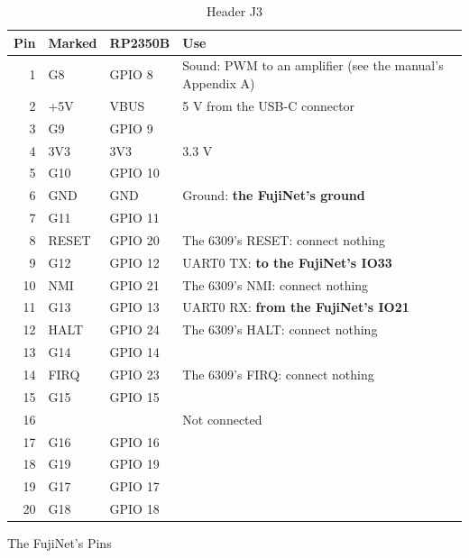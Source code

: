 \documentclass[10pt,twoside,openany]{book}
\makeatletter
\renewcommand{\section}{\@startsection{section}{1}{0pt}{3.2ex plus 1ex}{1.2ex}%
  {\sffamily\bfseries\large}}
\makeatother
\begin{document}
\begin{table}[H]
\caption{Header J3}\label{tab:j3}
\begin{tabularx}{\linewidth}{@{}r l l X@{}}
\toprule
\textbf{Pin} & \textbf{Marked} & \textbf{RP2350B} & \textbf{Use}\\
\midrule
1 & G8 & GPIO 8 & Sound: PWM to an amplifier (see the manual's Appendix A)\\
2 & +5V & VBUS & 5 V from the USB-C connector\\
3 & G9 & GPIO 9 & \\
4 & 3V3 & 3V3 & 3.3 V\\
5 & G10 & GPIO 10 & \\
6 & GND & GND & Ground: \textbf{the FujiNet's ground}\\
7 & G11 & GPIO 11 & \\
8 & RESET & GPIO 20 & The 6309's RESET: connect nothing\\
9 & G12 & GPIO 12 & UART0 TX: \textbf{to the FujiNet's IO33}\\
10 & NMI & GPIO 21 & The 6309's NMI: connect nothing\\
11 & G13 & GPIO 13 & UART0 RX: \textbf{from the FujiNet's IO21}\\
12 & HALT & GPIO 24 & The 6309's HALT: connect nothing\\
13 & G14 & GPIO 14 & \\
14 & FIRQ & GPIO 23 & The 6309's FIRQ: connect nothing\\
15 & G15 & GPIO 15 & \\
16 & & & Not connected\\
17 & G16 & GPIO 16 & \\
18 & G19 & GPIO 19 & \\
19 & G17 & GPIO 17 & \\
20 & G18 & GPIO 18 & \\
\bottomrule
\end{tabularx}
\end{table}

\section{The FujiNet's Pins}
\end{document}
